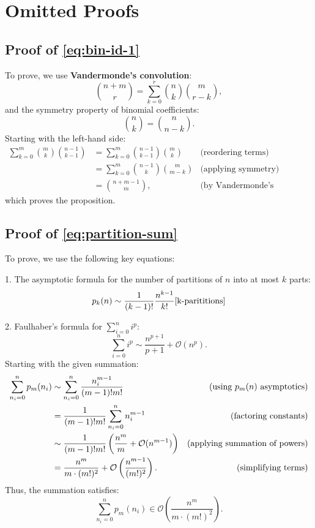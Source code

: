 \chapter{Omitted Proofs} \label{apx:omitted-proofs}

\section{Proof of \autoref{eq:bin-id-1}} \label{apx:proof-bin-id-1}

To prove, we use \textbf{Vandermonde's convolution}:
\[
\binom{n + m}{r} = \sum_{k=0}^r \binom{n}{k} \binom{m}{r-k},
\]
and the symmetry property of binomial coefficients:
\[
\binom{n}{k} = \binom{n}{n-k}.
\]
Starting with the left-hand side:
\begin{align*}
\sum_{k=0}^m \binom{m}{k} \binom{n-1}{k-1}
&= \sum_{k=0}^m \binom{n-1}{k-1} \binom{m}{k} & \text{(reordering terms)} \\
&= \sum_{k=0}^m \binom{n-1}{k} \binom{m}{m-k} & \text{(applying symmetry)} \\
&= \binom{n + m - 1}{m}, & \text{(by Vandermonde's convolution)}
\end{align*}
which proves the proposition.

\section{Proof of \autoref{eq:partition-sum}} \label{apx:proof-partition-sum}

To prove, we use the following key equations:

1. The asymptotic formula for the number of partitions of \(n\) into at most \(k\) parts:
\[
   p_k(n) \sim \frac{1}{(k-1)!} \frac{n^{k-1}}{k!} \cite{k-parititions}
\]

2. Faulhaber's formula for \( \sum_{i=0}^n i^p \):
\[
   \sum_{i=0}^n i^p \sim \frac{n^{p+1}}{p+1} + \mathcal{O}(n^p).
\]
Starting with the given summation:
\begin{align*}
\sum_{n_i=0}^n p_m(n_i)
&\sim \sum_{n_i=0}^n \frac{n_i^{m-1}}{(m-1)!m!} & \text{(using \( p_m(n) \) asymptotics)} \\
&= \frac{1}{(m-1)! m!} \sum_{n_i=0}^n n_i^{m-1} & \text{(factoring constants)} \\
&\sim \frac{1}{(m-1)! m!} \left( \frac{n^m}{m} + \mathcal{O}(n^{m-1}) \right) & \text{(applying summation of powers)} \\
&= \frac{n^m}{m \cdot (m!)^2} + \mathcal{O}\left(\frac{n^{m-1}}{(m!)^2}\right). & \text{(simplifying terms)}
\end{align*}
Thus, the summation satisfies:
\[
\sum_{n_i=0}^n p_m(n_i) \in \mathcal{O}\left(\frac{n^m}{m \cdot (m!)^2}\right).
\]
